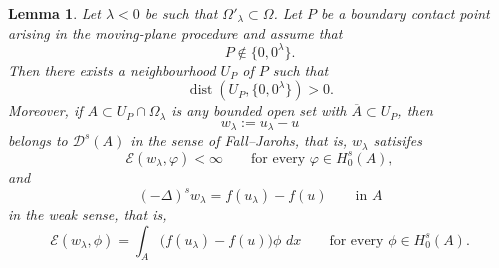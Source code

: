 \documentclass[11pt,a4paper]{article}
\newtheorem{lemma}[theorem]{Lemma}
\newcommand{\dd}{\,d}
\newcommand{\dist}{\operatorname{dist}}
\begin{document}
\begin{lemma}
\label{staccato dai poli}
Let \(\lambda<0\) be such that \(\Omega'_{\lambda} \subset \Omega\).
Let \(P\) be a boundary contact point arising in the moving-plane procedure and
assume that
\[
P\notin\{0,0^\lambda\}.
\]
Then there exists a neighbourhood \(U_P\) of \(P\) such that
\[
\dist(U_P,\{0,0^\lambda\})>0.
\]
Moreover, if \(A \subset U_P\cap\Omega_\lambda\) is any bounded open set
with \(\overline{A}\subset U_P\), then
\[
w_\lambda:=u_\lambda-u
\]
belongs to \(\mathcal{D}^{s}(A)\) in the sense of Fall--Jarohs, that is,
\(w_{\lambda}\) satisifes
\[
\mathcal E(w_{\lambda},\varphi)<\infty
\qquad
\text{for every }\varphi\in H^s_0(A),
\]
and
\[
(-\Delta)^s w_\lambda=f(u_\lambda)-f(u)
\qquad\text{in }A
\]
in the weak sense, that is,
\[
\mathcal E(w_\lambda,\phi)
=
\int_{A}
\bigl(f(u_\lambda)-f(u)\bigr)\phi\,\dd x
\qquad
\text{for every }\phi\in H^s_0(A).
\]
\end{lemma}
\end{document}
